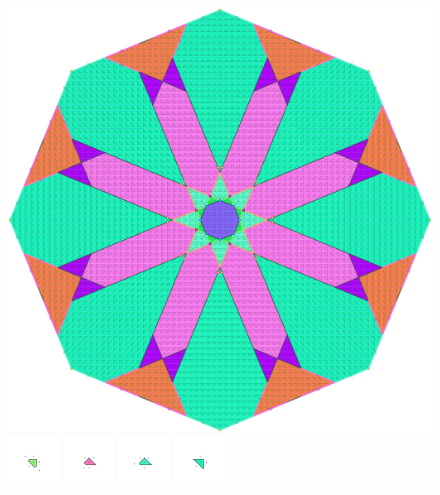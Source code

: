 \documentclass[text.tex]{subfiles}
\begin{document}
\clearpage
\pagestyle{fancy}
\fancyhf{}
\begin{figure}[h!]
\centering
\includegraphics[width=1\textwidth]{img/results/octagon/octagon_220710_(2_1alpha_2).pdf}
\includegraphics[width=0.12\textwidth]{img/results/octagon/octagon_220710_(2_1alpha_2)_001.pdf}
\includegraphics[width=0.12\textwidth]{img/results/octagon/octagon_220710_(2_1alpha_2)_002.pdf}
\includegraphics[width=0.12\textwidth]{img/results/octagon/octagon_220710_(2_1alpha_2)_003.pdf}
\includegraphics[width=0.12\textwidth]{img/results/octagon/octagon_220710_(2_1alpha_2)_004.pdf}

\end{figure}
\end{document}
